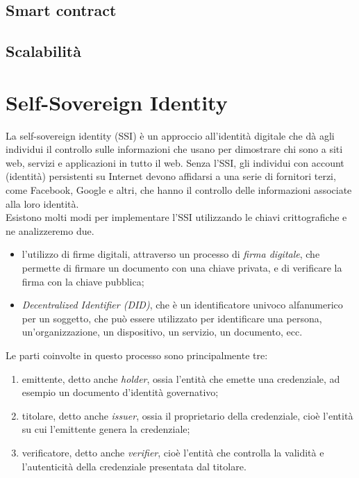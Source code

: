 \subsection{Smart contract}\label{sec:tecnologie-blockchain-avanziate-smart-contract}
\subsection{Scalabilità}\label{sec:tecnologie-blockchain-avanzate-scalabilità}

\section{Self-Sovereign Identity}\label{sec:self-sovereign-identity}

La self-sovereign identity (SSI) è un approccio all'identità digitale che dà agli individui 
il controllo sulle informazioni che usano per dimostrare chi sono a siti web, servizi e applicazioni in tutto il web. 
Senza l'SSI, gli individui con account (identità) persistenti su Internet devono affidarsi a una serie di fornitori terzi, come Facebook, Google e altri,
che hanno il controllo delle informazioni associate alla loro identità. \\

Esistono molti modi per implementare l'SSI utilizzando le chiavi crittografiche e ne analizzeremo due.
\begin{itemize}
    \item l'utilizzo di firme digitali, attraverso un processo di \textit{firma digitale}, che permette di firmare un documento con una chiave privata, e di verificare la firma con la chiave pubblica;
    \item \textit{Decentralized Identifier (DID)}, che è un identificatore univoco alfanumerico per un soggetto, che può essere utilizzato per identificare una persona, un'organizzazione, un dispositivo, un servizio, un documento, ecc.
\end{itemize}  

Le parti coinvolte in questo processo sono principalmente tre:
\begin{enumerate}
    \item {emittente, detto anche \textit{holder}}, ossia l'entità che emette una credenziale, ad esempio un documento d'identità governativo;
    \item {titolare, detto anche \textit{issuer}}, ossia il proprietario della credenziale, cioè l'entità su cui l'emittente genera la credenziale;
    \item {verificatore, detto anche \textit{verifier}}, cioè l'entità che controlla la validità e l'autenticità della credenziale presentata dal titolare.
\end{enumerate}  

